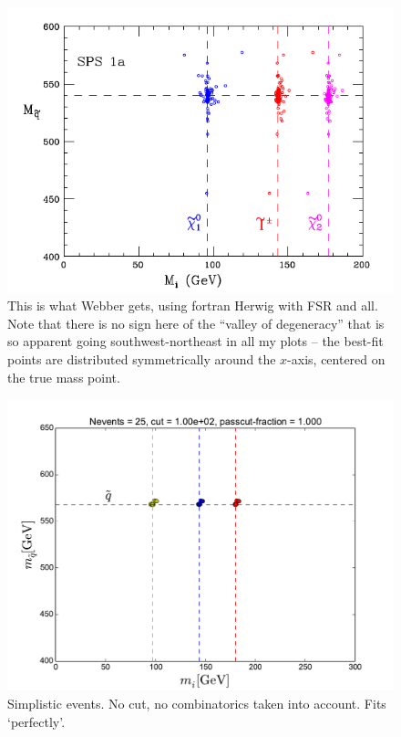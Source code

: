 \documentclass[twoside,english]{uiofysmaster}
\begin{document}
\begin{figure}[hbt]
\centering
\includegraphics[scale=1.0]{figures/making-sense/webber_nosmear.png} 
\caption{This is what Webber gets, using fortran Herwig with FSR and all. Note that there is no sign here of the ``valley of degeneracy'' that is so apparent going southwest-northeast in all my plots -- the best-fit points are distributed symmetrically around the $x$-axis, centered on the true mass point.}
\end{figure}

\begin{figure}[hbt]
\centering
\includegraphics[scale=0.7]{figures/making-sense/simple_combinatorics-OFF_nocut.pdf} 
\caption{Simplistic events. No cut, no combinatorics taken into account. Fits `perfectly'.}
\end{figure}
\end{document}
